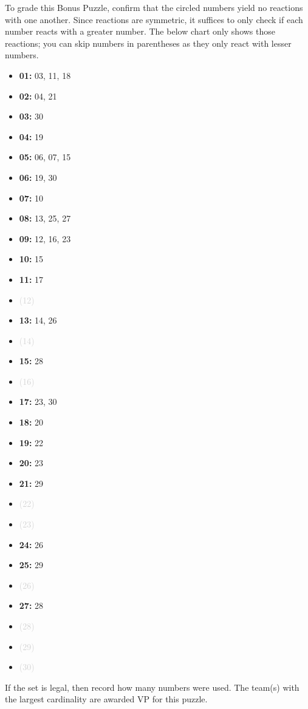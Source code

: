 


To grade this Bonus Puzzle, confirm that the circled numbers yield no reactions
with one another. Since reactions are symmetric, it suffices to only check
if each number reacts with a greater number. The below chart only shows those
reactions; you can skip numbers in parentheses as they only react with
lesser numbers.

  \begin{multicols}{3}\small
  \begin{itemize}
    \item \textbf{01:} 03, 11, 18
    \item \textbf{02:} 04, 21
    \item \textbf{03:} 30
    \item \textbf{04:} 19
    \item \textbf{05:} 06, 07, 15
    \item \textbf{06:} 19, 30
    \item \textbf{07:} 10
    \item \textbf{08:} 13, 25, 27
    \item \textbf{09:} 12, 16, 23
    \item \textbf{10:} 15
    \item \textbf{11:} 17
    \item \textcolor{lightgray}{(12)}
    \item \textbf{13:} 14, 26
    \item \textcolor{lightgray}{(14)}
    \item \textbf{15:} 28
    \item \textcolor{lightgray}{(16)}
    \item \textbf{17:} 23, 30
    \item \textbf{18:} 20
    \item \textbf{19:} 22
    \item \textbf{20:} 23
    \item \textbf{21:} 29
    \item \textcolor{lightgray}{(22)}
    \item \textcolor{lightgray}{(23)}
    \item \textbf{24:} 26
    \item \textbf{25:} 29
    \item \textcolor{lightgray}{(26)}
    \item \textbf{27:} 28
    \item \textcolor{lightgray}{(28)}
    \item \textcolor{lightgray}{(29)}
    \item \textcolor{lightgray}{(30)}
  \end{itemize}
  \end{multicols}

If the set is legal, then record how many numbers were used. The team(s)
with the largest cardinality are awarded VP for this puzzle.
